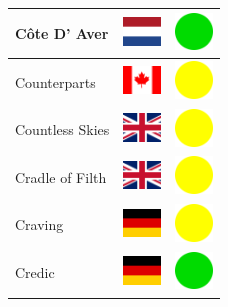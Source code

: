 \documentclass[12pt, a4paper, twoside]{report}
\begin{document}
\begin{center}
\begin{longtable}{|p{5cm}|p{2cm}|p{2cm}|}
 Côte D' Aver                                               & \includegraphics[width=1cm]{../img/flags/nl} &   \includegraphics[width=1cm]{../likes/y} \\ \hline
 Counterparts                                               & \includegraphics[width=1cm]{../img/flags/ca} &   \includegraphics[width=1cm]{../likes/m} \\ \hline
 Countless Skies                                            & \includegraphics[width=1cm]{../img/flags/gb} &   \includegraphics[width=1cm]{../likes/m} \\ \hline
 Cradle of Filth                                            & \includegraphics[width=1cm]{../img/flags/gb} &   \includegraphics[width=1cm]{../likes/m} \\ \hline
 Craving                                                    & \includegraphics[width=1cm]{../img/flags/de} &   \includegraphics[width=1cm]{../likes/m} \\ \hline
 Credic                                                     & \includegraphics[width=1cm]{../img/flags/de} &   \includegraphics[width=1cm]{../likes/y} \\ \hline

\end{longtable}
\end{center}
\end{document}
